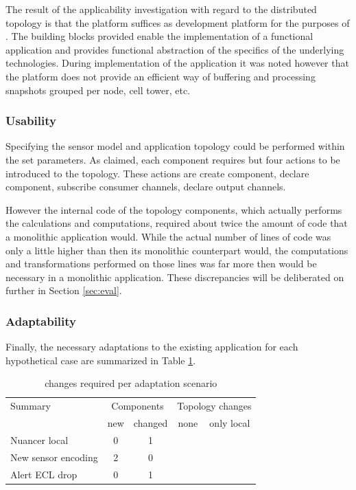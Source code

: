 The result of the applicability investigation with regard to the distributed topology is that the platform suffices as development platform for the purposes of \idsystems. The building blocks provided enable the implementation of a functional application and provides functional abstraction of the specifics of the underlying technologies.  During implementation of the application it was noted however that the platform does not provide an efficient way of buffering and processing snapshots grouped per node, cell tower, etc. 

\subsubsection{Usability}
Specifying the sensor model and application topology could be performed within the set parameters. As claimed, each component requires but four actions to be introduced to the topology. These actions are create component, declare component, subscribe consumer channels, declare output channels.

However the internal code of the topology components, which actually performs the calculations and computations, required about twice the amount of code that a monolithic application would. While the actual number of lines of code was only a little higher than then its monolithic counterpart would, the computations and transformations performed on those lines was far more then would be necessary in a monolithic application. These discrepancies will be deliberated on further in Section \ref{sec:eval}.

\subsubsection{Adaptability}
Finally, the necessary adaptations to the existing application for each hypothetical case are summarized in Table \ref{table:adaptations}.

\begin{table}
\centering
\begin{tabular}{|l||c|c||c|c|} \hline
Summary				& \multicolumn{2}{c||}{Components}		& \multicolumn{2}{c|}{Topology changes} \\ 
					& new 	& changed 	& none 		& only local  \\ \hline 
Nuancer local		& 0		& 1			&			& \cmark \\ \hline
New sensor encoding	& 2		& 0			& 			& \cmark \\ \hline
Alert ECL drop		& 0		& 1			& \cmark	&		 \\ \hline
\end{tabular}
\caption{changes required per adaptation scenario}
\label{table:adaptations}
\end{table}

